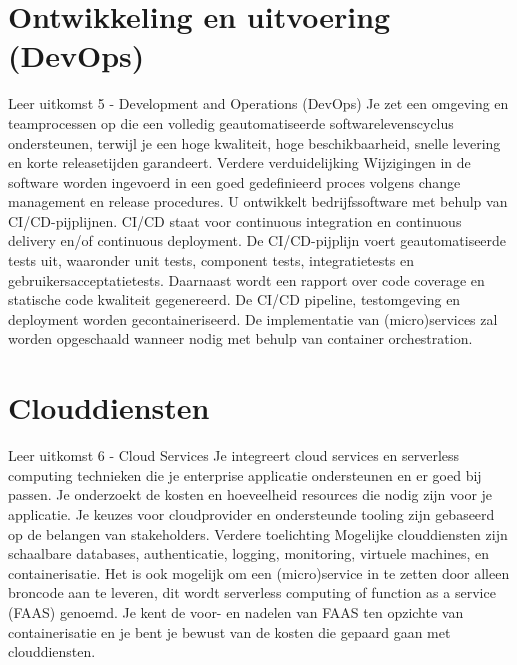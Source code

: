 \section{Ontwikkeling en uitvoering (DevOps)}\label{sec:ontwikkeling-en-uitvoering-(devops)}
Leer uitkomst 5 - Development and Operations (DevOps) Je zet een omgeving en teamprocessen op die een volledig geautomatiseerde softwarelevenscyclus ondersteunen, terwijl je een hoge kwaliteit, hoge beschikbaarheid, snelle levering en korte releasetijden garandeert.
Verdere verduidelijking Wijzigingen in de software worden ingevoerd in een goed gedefinieerd proces volgens change management en release procedures.
U ontwikkelt bedrijfssoftware met behulp van CI/CD-pijplijnen.
CI/CD staat voor continuous integration en continuous delivery en/of continuous deployment.
De CI/CD-pijplijn voert geautomatiseerde tests uit, waaronder unit tests, component tests, integratietests en gebruikersacceptatietests.
Daarnaast wordt een rapport over code coverage en statische code kwaliteit gegenereerd.
De CI/CD pipeline, testomgeving en deployment worden gecontaineriseerd.
De implementatie van (micro)services zal worden opgeschaald wanneer nodig met behulp van container orchestration.






\section{Clouddiensten}\label{sec:clouddiensten}
Leer uitkomst 6 - Cloud Services Je integreert cloud services en serverless computing technieken die je enterprise applicatie ondersteunen en er goed bij passen.
Je onderzoekt de kosten en hoeveelheid resources die nodig zijn voor je applicatie.
Je keuzes voor cloudprovider en ondersteunde tooling zijn gebaseerd op de belangen van stakeholders.
Verdere toelichting Mogelijke clouddiensten zijn schaalbare databases, authenticatie, logging, monitoring, virtuele machines, en containerisatie.
Het is ook mogelijk om een (micro)service in te zetten door alleen broncode aan te leveren, dit wordt serverless computing of function as a service (FAAS) genoemd.
Je kent de voor- en nadelen van FAAS ten opzichte van containerisatie en je bent je bewust van de kosten die gepaard gaan met clouddiensten.






